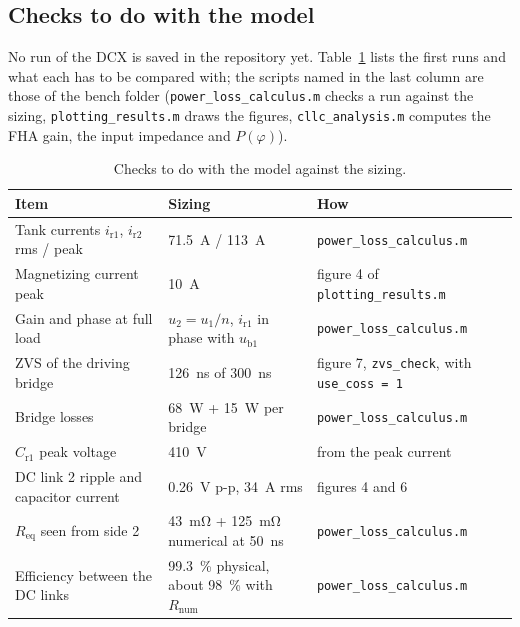 \documentclass[12pt,a4paper]{scrartcl}
\newcommand{\ped}[1]{_{\mathrm{#1}}}
\newcommand{\code}[1]{\texttt{#1}}
\begin{document}
\begin{onehalfspace}
\subsection{Checks to do with the model}
\label{sec:checks}

No run of the DCX is saved in the repository yet. Table~\ref{tab:checks} lists the first runs and what each has to be compared with; the scripts named in the last column are those of the bench folder (\code{power\_loss\_calculus.m} checks a run against the sizing, \code{plotting\_results.m} draws the figures, \code{cllc\_analysis.m} computes the FHA gain, the input impedance and $P(\varphi)$).

\begin{table}[H]
	\centering
	\captionsetup{width=0.9\textwidth, font=small}
	\caption{Checks to do with the model against the sizing.}
	\label{tab:checks}
	\small
	\begin{tabularx}{0.97\textwidth}{@{} >{\raggedright\arraybackslash}p{} >{\raggedright\arraybackslash}p{} X @{}}
		\toprule
		\textbf{Item} & \textbf{Sizing} & \textbf{How} \\
		\midrule
		Tank currents $i\ped{r1}$, $i\ped{r2}$ rms / peak & \SI{71.5}{\ampere} / \SI{113}{\ampere} & \code{power\_loss\_calculus.m} \\
		Magnetizing current peak & \SI{10}{\ampere} & figure 4 of \code{plotting\_results.m} \\
		Gain and phase at full load & $u\ped{2} = u\ped{1}/n$, $i\ped{r1}$ in phase with $u\ped{b1}$ & \code{power\_loss\_calculus.m} \\
		ZVS of the driving bridge & \SI{126}{\nano\second} of \SI{300}{\nano\second} & figure 7, \code{zvs\_check}, with \code{use\_coss = 1} \\
		Bridge losses & \SI{68}{\watt} + \SI{15}{\watt} per bridge & \code{power\_loss\_calculus.m} \\
		$C\ped{r1}$ peak voltage & \SI{410}{\volt} & from the peak current \\
		DC link 2 ripple and capacitor current & \SI{0.26}{\volt} p-p, \SI{34}{\ampere} rms & figures 4 and 6 \\
		$R\ped{eq}$ seen from side 2 & \SI{43}{\milli\ohm} + \SI{125}{\milli\ohm} numerical at \SI{50}{\nano\second} & \code{power\_loss\_calculus.m} \\
		Efficiency between the DC links & \SI{99.3}{\percent} physical, about \SI{98}{\percent} with $R\ped{num}$ & \code{power\_loss\_calculus.m} \\

\end{tabularx}
\end{table}
\end{onehalfspace}
\end{document}
